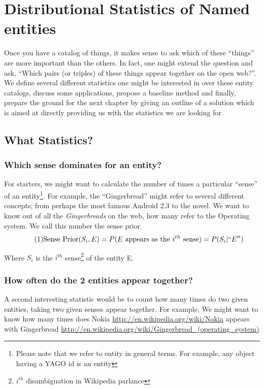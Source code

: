 \chapter{Distributional Statistics of Named entities}
Once you have a catalog of things, it makes sense to ask which of these ``things'' are more important than the others.
In fact, one might extend the question and ask, ``Which pairs (or triples) of these things appear together on the open web?''.
We define several different statistics one might be interested in over these entity catalogs, discuss some applications, 
propose a baseline method and finally, prepare the ground for the next chapter by giving an outline of a solution 
which is aimed at directly providing us with the statistics we are looking for. 

\section{What Statistics?}

\subsection{Which sense dominates for an entity?}
For starters, we might want to calculate the number of times a particular ``sense'' of an entity\footnote{Please note that we 
refer to entity in general terms. For example, any object having a YAGO id is an entity}. 
For example, the ``Gingerbread'' might refer to several different concepts; from perhaps the most famous Android 2.3 to the novel.
We want to know out of all the \emph{Gingerbreads} on the web, how many refer to the Operating system. 
We call this number the sense prior.
\begin{equation}
\tag{1}
\text{Sense Prior}(S_i, E) =  P(E\text{ appears as the $i^{th}$ sense}) = P(S_i | ``E'')
\end{equation}

Where $S_i$ is the $i^{th}$ sense\footnote{$i^{th}$ disambiguation in Wikipedia parlance} of the entity E. 

\subsection{How often do the 2 entities appear together?}
A second interesting statistic would be to count how many times do two given entities, taking two given senses appear together.
For example, We might want to know how many times does Nokia \url{http://en.wikipedia.org/wiki/Nokia} appears with Gingerbread \url{http://en.wikipedia.org/wiki/Gingerbread_(operating_system)}

